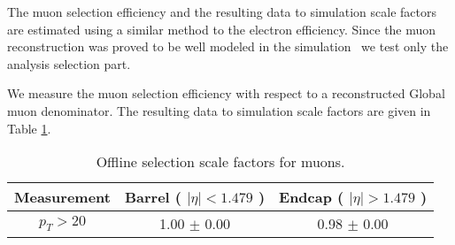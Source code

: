 
The muon selection efficiency and the resulting data to simulation
scale factors are estimated using a similar method to the electron efficiency.
Since the muon reconstruction was proved to be well modeled in the simulation~\cite{VBTFCrossSectionNote}
we test only the analysis selection part.

We measure the muon selection efficiency with respect to a reconstructed Global muon
denominator.
The resulting data to simulation scale factors are given in Table \ref{tab:eff_mu_offline}.

\begin{table}[!ht]
\begin{center}
\begin{tabular}{c|c|c}
\hline
Measurement & Barrel ( $|\eta|<1.479$ )   & Endcap ( $|\eta|>1.479$ )  \\ 
\hline
$  p_T>     20$ & 1.00 $\pm$ 0.00  & 0.98 $\pm$ 0.00  \\ \hline
\end{tabular}
\caption{Offline selection scale factors for muons.}
\label{tab:eff_mu_offline}
\end{center}
\end{table}

